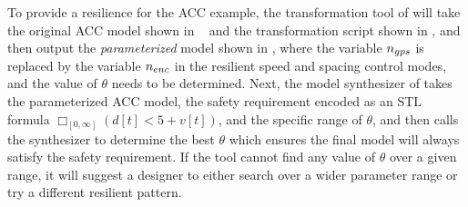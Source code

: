 To provide a resilience for the ACC example, the transformation tool of \toolreaffirm will take the original ACC model shown in ~ and the transformation script shown in , and then output the \emph{parameterized} model shown in , where the variable $n_{gps}$ is replaced by the variable $n_{enc}$ in the resilient speed and spacing control modes, and the value of $\theta$ needs to be determined. Next, the model synthesizer of \toolreaffirm takes the parameterized ACC model, the safety requirement encoded as an STL formula $\Box_{[0, \infty]} (d[t] < 5 + v[t])$, and the specific range of $\theta$, and then calls the synthesizer to determine the best $\theta$ which ensures the final model will always satisfy the safety requirement. If the tool cannot find any value of $\theta$ over a given range, it will suggest a designer to either search over a wider parameter range or try a different resilient pattern.   
%
%

